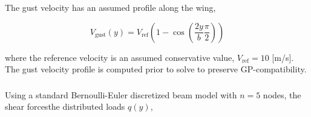 \DIFdelend The gust velocity has an assumed profile along the wing\cite{acgust},

\begin{equation}
    \label{e:gustwind}
    V_{\text{gust}}(y) = V_{\text{ref}} \left(1-\cos\left(\frac{2y}{b} \frac{\pi}{2} \right) \right)
\end{equation}

where the reference velocity is an assumed conservative value\cite{acgust}, $V_{\text{ref}} = 10$ [m/s]. The gust velocity profile is computed prior to solve to preserve GP-compatibility.

\DIFdelbegin \subsubsection{}
\addtocounter{subsubsection}{-1}%
\DIFdelend \DIFaddbegin \paragraph{\textbf{}} 
\DIFaddend 

Using a standard Bernoulli-Euler discretized beam model with $n=5$ nodes\DIFaddbegin {}\DIFaddend , the shear forces\DIFdelbegin {}\DIFdelend \DIFaddbegin {}\DIFaddend the distributed loads $q(y)$, \DIFdelbegin {}\DIFdelend \DIFaddbegin {}


